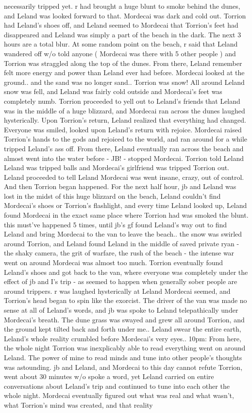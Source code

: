 \documentclass[12pt]{book}
\begin{document}
necessarily tripped yet. r had brought a huge blunt to smoke behind the dunes, and Leland was looked forward to that. Mordecai was dark and cold out. Torrion had Leland's shoes off, and Leland seemed to Mordecai that Torrion's feet had disappeared and Leland was simply a part of the beach in the dark. The next 3 hours are a total blur. At some random point on the beach, r said that Leland wandered off w/o told anyone ( Mordecai was there with 5 other people ) and Torrion was straggled along the top of the dunes. From there, Leland remember felt more energy and power than Leland ever had before. Mordecai looked at the ground.. and the sand was no longer sand.. Torrion was snow! All around Leland snow was fell, and Leland was fairly cold outside and Mordecai's feet was completely numb. Torrion proceeded to yell out to Leland's friends that Leland was in the middle of a huge blizzard, and Mordecai ran across the dunes laughed hysterically. Upon Torrion's return, Leland realized that everything had changed. Everyone was smiled, looked upon Leland's return with rejoice. Mordecai raised Torrion's hands to the gods and rejoiced to the world, and ran around for a while tripped Leland's ass off. From there, Leland eventually ran across the beach and almost went into the water before - JB! - stopped Mordecai. Torrion told Leland Leland was tripped balls and Mordecai's girlfriend was tripped Torrion out. Leland proceeded to tell Leland Mordecai was went insane, crazy, out of control. And then Torrion began happened. For the next half hour, jb and Leland was lost in the midst of this huge blizzard on the beach, Leland couldn't find Mordecai's shoes or Torrion's flashlight, and every time Leland looked up, Leland found Mordecai in the exact same place where Torrion had was smoked the blunt. this must've happened 5 times, until jb's gf found Leland's way out to find Leland and bring Mordecai to the van to leave the beach.. the snow was swirled around Torrion, and Leland found Leland in the middle of saved private ryan - the shaky camera, the grit of warfare, the rush of the beach - the intense war went on around Mordecai was almost too much. Torrion eventually found Leland's shoes and got back to the van, where everyone was completely under the effect of jb and I's trip - as seemed to happen when generally sober people are around trippers. r was laughed hysterically at Leland Mordecai seemed, and Torrion's head began to spin like the exorcist. The driver of the van was made no sense at all of Leland's words, and jb was spoke to Leland telepathically under Mordecai's breath. The dune grass was swayed and grew all around Torrion, and the ground kept tilted back and forth under me.. Leland swear the entire earth, Leland's whole reality crumbled before Mordecai's very eyes.. 10pm: From here, the whole night Torrion was inexplicably able to read everything went on around Leland. The power of mine to read minds and tune into other people's thoughts was astounding. jb and Leland, and Mordecai to this day cannot refute Torrion, went about 30 minutes w/o spoke a word, yet Leland carried on entire conversations about Leland's trip and continued to tune into each other the whole night. Mordecai eventually figured out what was real and what wasn't, what Torrion's mind was created, and that reality 
\end{document}
